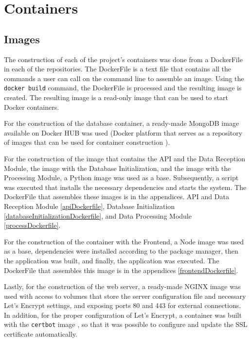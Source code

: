\section{Containers}\label{sec:containersimpl}

\subsection{Images}\label{subsec:containersimagesDefinition}
The construction of each of the project's containers was done from a DockerFile in each of the repositories. The DockerFile is a text file that contains all the commands a user can call on the command line to assemble an image. Using the \texttt{docker build} command, the DockerFile is processed and the resulting image is created. The resulting image is a read-only image that can be used to start Docker containers.

For the construction of the database container, a ready-made MongoDB image available on Docker HUB \cite{dockerMongo} was used (Docker platform that serves as a repository of images that can be used for container construction \cite{dockerHub}).

For the construction of the image that contains the API and the Data Reception Module, the image with the Database Initialization, and the image with the Processing Module, a Python image \cite{dockerPython} was used as a base. Subsequently, a script was executed that installs the necessary dependencies and starts the system. The DockerFile that assembles these images is in the appendices. API and Data Reception Module \ref{apiDockerfile}, Database Initialization \ref{databaseInitializationDockerfile}, and Data Processing Module \ref{processDockerfile}.

For the construction of the container with the Frontend, a Node image \cite{dockerNode} was used as a base, dependencies were installed according to the package manager, then the application was built, and finally, the application was executed. The DockerFile that assembles this image is in the appendices \ref{frontendDockerfile}.

Lastly, for the construction of the web server, a ready-made NGINX image \cite{dockerNginx} was used with access to volumes that store the server configuration file and necessary Let's Encrypt settings, and exposing ports 80 and 443 for external connections. In addition, for the proper configuration of Let's Encrypt, a container was built with the \texttt{certbot} image \cite{dockerCertbot}, so that it was possible to configure and update the SSL certificate automatically.

